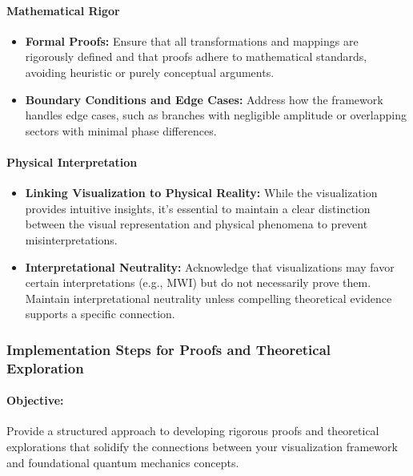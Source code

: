 \documentclass[12pt]{article}
\begin{document}
\paragraph{Mathematical Rigor}
\begin{itemize}
    \item \textbf{Formal Proofs:} Ensure that all transformations and mappings are rigorously defined and that proofs adhere to mathematical standards, avoiding heuristic or purely conceptual arguments.
    
    \item \textbf{Boundary Conditions and Edge Cases:} Address how the framework handles edge cases, such as branches with negligible amplitude or overlapping sectors with minimal phase differences.
\end{itemize}

\paragraph{Physical Interpretation}
\begin{itemize}
    \item \textbf{Linking Visualization to Physical Reality:} While the visualization provides intuitive insights, it’s essential to maintain a clear distinction between the visual representation and physical phenomena to prevent misinterpretations.
    
    \item \textbf{Interpretational Neutrality:} Acknowledge that visualizations may favor certain interpretations (e.g., MWI) but do not necessarily prove them. Maintain interpretational neutrality unless compelling theoretical evidence supports a specific connection.
\end{itemize}

\subsubsection{Implementation Steps for Proofs and Theoretical Exploration}
\paragraph{Objective:} Provide a structured approach to developing rigorous proofs and theoretical explorations that solidify the connections between your visualization framework and foundational quantum mechanics concepts.
\end{document}
